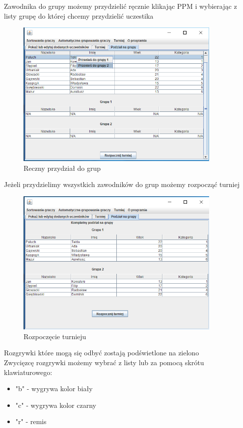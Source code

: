 Zawodnika do grupy możemy przydzielić ręcznie klikając PPM i wybierając z listy grupę do której chcemy przydzielić uczestika
\begin{figure}[H]
	\centering
	\includegraphics[width=10cm]{fig/10}
	\caption{Reczny przydział do grup}
	\label {fig:Reczny_przydzial_do_grup} 
\end{figure}
Jeżeli przydzielimy wszystkich zawodników do grup możemy rozpocząć turniej
\begin{figure}[H]
	\centering
	\includegraphics[width=10cm]{fig/11}
	\caption{Rozpoczęcie turnieju}
	\label {fig:rozpoczecie_turnieju} 
\end{figure}
Rozgrywki które mogą się odbyć zostają podświetlone na zielono\\
Zwycięzcę rozgrywki możemy wybrać z listy lub za pomocą skrótu klawiaturowego:
\begin{itemize}
	\item "b" - wygrywa kolor biały
	\item "c" - wygrywa kolor czarny
	\item "r" - remis
\end{itemize}

